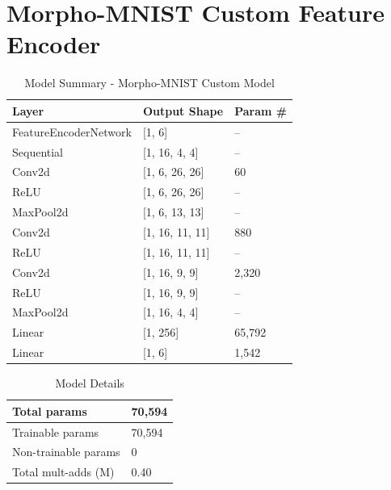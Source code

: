 \documentclass[12pt,DIV14,BCOR12mm,a4paper,footinclude=false,headinclude,parskip=half-,twoside,openright,cleardoublepage=empty,toc=index,bibliography=totoc,listof=totoc]{scrreprt}
\numberwithin{equation}{chapter}
\begin{document}
\section{Morpho-MNIST Custom Feature Encoder}
\vspace{-0.5cm}
\begin{table}[H]
\caption{Model Summary - Morpho-MNIST Custom Model}
\centering
\begin{tabular}{|l|l|l|}
\hline
Layer & Output Shape & Param \# \\
\hline
FeatureEncoderNetwork & [1, 6] & -- \\
\hline
\quad Sequential & [1, 16, 4, 4] & -- \\
\quad\quad Conv2d & [1, 6, 26, 26] & 60 \\
\quad\quad ReLU & [1, 6, 26, 26] & -- \\
\quad\quad MaxPool2d & [1, 6, 13, 13] & -- \\
\quad\quad Conv2d & [1, 16, 11, 11] & 880 \\
\quad\quad ReLU & [1, 16, 11, 11] & -- \\
\quad\quad Conv2d & [1, 16, 9, 9] & 2,320 \\
\quad\quad ReLU & [1, 16, 9, 9] & -- \\
\quad\quad MaxPool2d & [1, 16, 4, 4] & -- \\
\hline
\quad Linear & [1, 256] & 65,792 \\
\quad Linear & [1, 6] & 1,542 \\
\hline
\end{tabular}
\label{tab:model_summary}
\end{table}

\begin{table}[ht]
\caption{Model Details}
\centering
\begin{tabular}{|l|l|}
\hline
Total params & 70,594 \\
\hline
Trainable params & 70,594 \\
\hline
Non-trainable params & 0 \\
\hline
Total mult-adds (M) & 0.40 \\
\hline
\end{tabular}
\label{tab:model_details}
\end{table}
\end{document}
